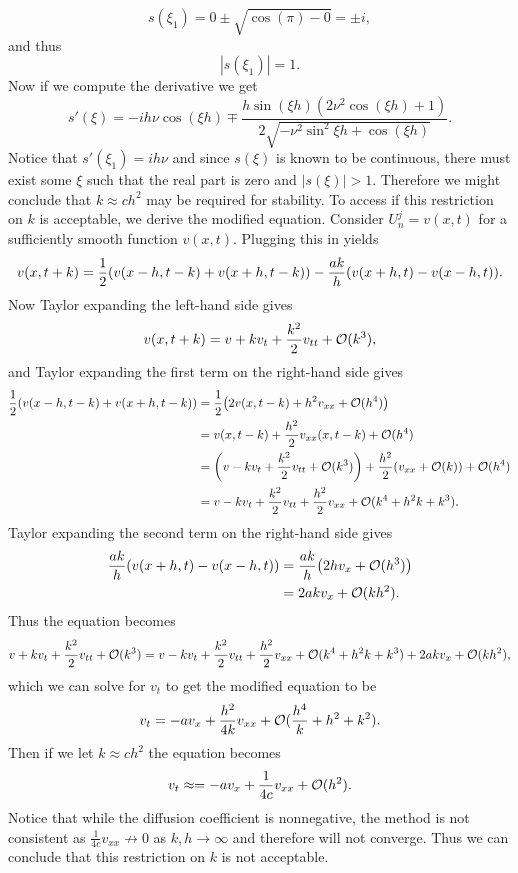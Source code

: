 \documentclass[12pt]{report}
\begin{document}
\begin{solution}
\[
  s(\xi_1) = 0 \pm \sqrt{\cos(\pi) - 0} = \pm i,
\]
and thus 
\[
  |s(\xi_1)| = 1.
\]
Now if we compute the derivative we get
\[ 
  s'(\xi) = -ih\nu \cos(\xi h) \mp \frac{h \sin(\xi h)(2\nu^2\cos(\xi h) + 1)}{2\sqrt{-\nu^2 \sin^2{\xi h} + \cos(\xi h)}}.
\]
Notice that $s'(\xi_1) = ih\nu$ and since $s(\xi)$ is known to be continuous, there must exist some $\xi$ such that the real part is zero and $|s(\xi)| > 1$. Therefore we might conclude that $k\approx ch^2$ may be required for stability. To access if this restriction on $k$ is acceptable, we derive the modified equation. Consider $U^j_n = v(x,t)$ for a sufficiently smooth function $v(x,t)$. Plugging this in yields
\[
 v(x,t+k) = \frac{1}{2}{\left(v(x-h,t-k) + v(x+h,t-k)\right)}  - \frac{ak}{h}{\left(v(x+h,t) - v(x-h,t)\right)}.
\]
Now Taylor expanding the left-hand side gives
\[
  v(x,t+k) = v + kv_t + \frac{k^2}{2}v_{tt} + {\mathcal{O}}(k^3),
\]
and Taylor expanding the first term on the right-hand side gives
\begin{align*}
  \frac{1}{2}{\left(v(x-h,t-k) + v(x+h,t-k)\right)} &= \frac{1}{2}{\left(2v(x,t-k) + h^2v_{xx} + {\mathcal{O}}(h^4)\right)}\\
  &= v(x,t-k) + \frac{h^2}{2}v_{xx}(x,t-k) + {\mathcal{O}}(h^4)\\
  &= {\left(v - kv_t + \frac{k^2}{2}v_{tt} + {\mathcal{O}}(k^3)\right)} + \frac{h^2}{2}{\left(v_{xx} + {\mathcal{O}}(k)\right)} + {\mathcal{O}}(h^4)\\
  &= v - kv_t + \frac{k^2}{2}v_{tt} + \frac{h^2}{2}v_{xx} + {\mathcal{O}}(k^4+ h^2k + k^3).
\end{align*}
Taylor expanding the second term on the right-hand side gives
\begin{align*}
  \frac{ak}{h}{\left(v(x+h,t) - v(x-h,t)\right)} &= \frac{ak}{h}{\left(2hv_x + {\mathcal{O}}(h^3)\right)}\\
  &= 2akv_x + {\mathcal{O}}(kh^2).
\end{align*}
Thus the equation becomes 
\[
  v + kv_t + \frac{k^2}{2}v_{tt} + {\mathcal{O}}(k^3) = v - kv_t + \frac{k^2}{2}v_{tt} + \frac{h^2}{2}v_{xx} + {\mathcal{O}}(k^4+ h^2k + k^3) + 2akv_x + {\mathcal{O}}(kh^2),
\]
which we can solve for $v_t$ to get the modified equation to be
\[
  v_t = - av_x + \frac{h^2}{4k}v_{xx} + {\mathcal{O}}(\frac{h^4}{k} + h^2 + k^2).  
\]
Then if we let $k \approx ch^2$ the equation becomes
\[
  v_t \approx = -av_x + \frac{1}{4c}v_{xx} + {\mathcal{O}}(h^2).
\]
Notice that while the diffusion coefficient is nonnegative, the method is not consistent as $\frac{1}{4c}v_{xx} \not\to 0$ as $k,h \to \infty$ and therefore will not converge. Thus we can conclude that this restriction on $k$ is not acceptable. 

\end{solution}
\end{document}
